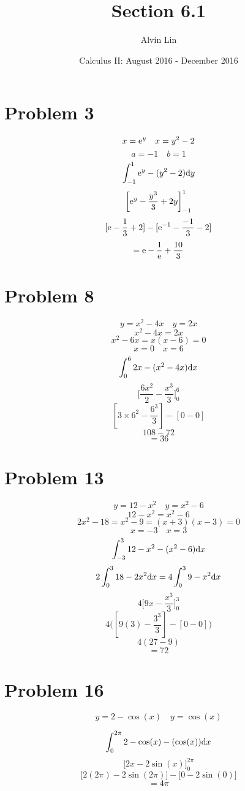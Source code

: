 \documentclass[letterpaper, 12pt]{math}
\title{Section 6.1}
\author{Alvin Lin}
\date{Calculus II: August 2016 - December 2016}
\begin{document}
\maketitle

\section*{Problem 3}
\[ x = \mathrm{e}^{y} \quad x = y^{2}-2 \]
\[ a = -1 \quad b = 1 \]
\[ \int_{-1}^{1}{\mathrm{e}^{y}-(y^{2}-2)\mathrm{d}{y}} \]
\[ \bigg[\mathrm{e}^{y}-\frac{y^{3}}{3}+2y\bigg]_{-1}^{1} \]
\[ [\mathrm{e}-\frac{1}{3}+2]-[\mathrm{e}^{-1}-\frac{-1}{3}-2] \]
\[ = \mathrm{e}-\frac{1}{\mathrm{e}}+\frac{10}{3} \]

\section*{Problem 8}
\[ y = x^{2}-4x \quad y = 2x \]
\[ x^{2}-4x = 2x \]
\[ x^{2}-6x = x(x-6) = 0 \]
\[ x = 0 \quad x = 6 \]
\[ \int_{0}^{6}{2x-(x^{2}-4x)\mathrm{d}{x}} \]
\[ \bigg[\frac{6x^{2}}{2}-\frac{x^{3}}{3}\bigg]_{0}^{6} \]
\[ [3\times6^{2}-\frac{6^{3}}{3}]-[0-0] \]
\[ 108-72 \]
\[ = 36 \]

\section*{Problem 13}
\[ y = 12-x^{2} \quad y = x^{2}-6 \]
\[ 12-x^{2} = x^{2}-6 \]
\[ 2x^{2}-18 = x^{2}-9 = (x+3)(x-3) = 0 \]
\[ x = -3 \quad x = 3 \]
\[ \int_{-3}^{3}{12-x^{2}-(x^{2}-6)\mathrm{d}{x}} \]
\[ 2\int_{0}^{3}{18-2x^{2}\mathrm{d}{x}} = 4\int_{0}^{3}{9-x^{2}\mathrm{d}{x}} \]
\[ 4\bigg[9x-\frac{x^{3}}{3}\bigg]_{0}^{3} \]
\[ 4\bigg([9(3)-\frac{3^{3}}{3}]-[0-0]\bigg) \]
\[ 4(27-9) \]
\[ = 72 \]

\section*{Problem 16}
\[ y = 2-\cos(x) \quad y = \cos(x) \]
\begin{center}
\end{center}
\[ \int_{0}^{2\pi}{2-\cos(x)-(\cos(x))\mathrm{d}{x}} \]
\[ \bigg[2x-2\sin(x)\bigg]_{0}^{2\pi} \]
\[ \bigg[2(2\pi)-2\sin(2\pi)\bigg]-\bigg[0-2\sin(0)\bigg] \]
\[ = 4\pi \]
\end{document}
